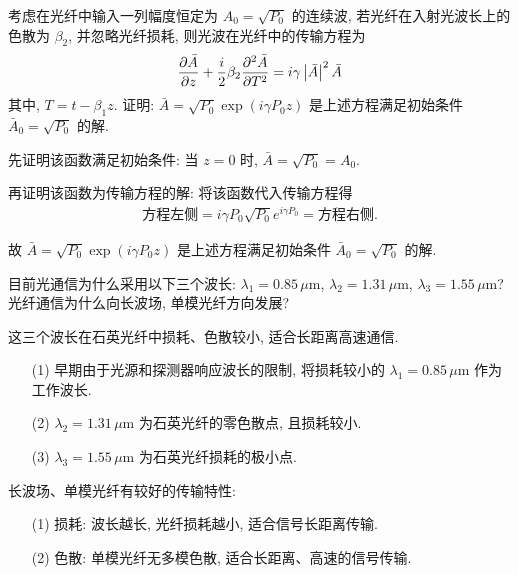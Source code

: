 \documentclass{assignment}
\begin{document}
\begin{prob}
    考虑在光纤中输入一列幅度恒定为 $A_0=\sqrt{P_0}$ 的连续波, 若光纤在入射光波长上的色散为 $\beta_2$, 并忽略光纤损耗, 则光波在光纤中的传输方程为
    \[
        \frac{\partial\bar{A}}{\partial z}+\frac{i}{2}\beta_2\frac{\partial^2\bar{A}}{\partial T^2}=i\gamma\left\lvert\bar{A}\right\rvert^2\bar{A}
    \]
    其中, $T=t-\beta_1z$. 证明: $\bar{A}=\sqrt{P_0}\exp(i\gamma P_0z)$ 是上述方程满足初始条件 $\bar{A}_0=\sqrt{P_0}$ 的解.
\end{prob}
\begin{pf}
    先证明该函数满足初始条件: 当 $z=0$ 时, $\bar{A}=\sqrt{P_0}=A_0$.

    再证明该函数为传输方程的解: 将该函数代入传输方程得
    \begin{align}
        \text{方程左侧}=i\gamma P_0\sqrt{P_0}e^{i\gamma P_0}=\text{方程右侧}.
    \end{align}

    故 $\bar{A}=\sqrt{P_0}\exp(i\gamma P_0z)$ 是上述方程满足初始条件 $\bar{A}_0=\sqrt{P_0}$ 的解.
\end{pf}

\begin{prob}
    目前光通信为什么采用以下三个波长: $\lambda_1=0.85\,\mu$m, $\lambda_2=1.31\,\mu$m, $\lambda_3=1.55\,\mu$m? 光纤通信为什么向长波场, 单模光纤方向发展?
\end{prob}
\begin{sol}
    这三个波长在石英光纤中损耗、色散较小, 适合长距离高速通信.

    \begin{itemize}
        \item[(1)] 早期由于光源和探测器响应波长的限制, 将损耗较小的 $\lambda_1=0.85\,\mu$m 作为工作波长.
        \item[(2)] $\lambda_2=1.31\,\mu$m 为石英光纤的零色散点, 且损耗较小.
        \item[(3)] $\lambda_3=1.55\,\mu$m 为石英光纤损耗的极小点.
    \end{itemize}

    长波场、单模光纤有较好的传输特性:
    \begin{itemize}
        \item[(1)] 损耗: 波长越长, 光纤损耗越小, 适合信号长距离传输.
        \item[(2)] 色散: 单模光纤无多模色散, 适合长距离、高速的信号传输.
    \end{itemize}
\end{sol}
\end{document}
